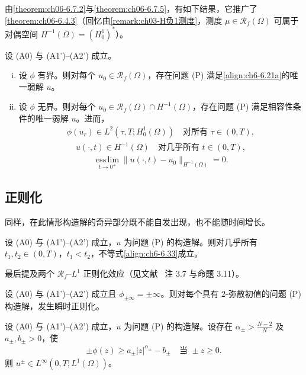 \documentclass[../../main.tex]{subfiles}%
\begin{document}
由\cref{theorem:ch06-6.7.2}与\cref{theorem:ch06-6.7.5}，有如下结果，它推广了\cref{theorem:ch06-6.4.3}（回忆由\cref{remark:ch03-H负1测度}，测度 $\mu\in\mathscr{R}_f(\Omega)$ 可属于对偶空间 $H^{-1}(\Omega)=(H^1_0)^*$）。

\begin{theorem}\label{theorem:ch06-6.7.6}
设 (A0) 与 (A1')--(A2') 成立。
\begin{enumerate}[(i)]
\item 设 $\phi$ 有界。则对每个 $u_0\in\mathscr{R}_f(\Omega)$，存在问题 (P) 满足\eqref{align:ch6-6.21a}的唯一弱解 $u$。
\item 设 $\phi$ 无界。则对每个 $u_0\in\mathscr{R}_f(\Omega)\cap H^{-1}(\Omega)$，存在问题 (P) 满足相容性条件的唯一弱解 $u$。进而，
\begin{align}
\phi(u_r)\in L^2(\tau,T;H^1_0(\Omega)) \quad\text{对所有 }\tau\in(0,T), \label{align:ch6-6.139a}
\end{align}
\begin{align}
u(\cdot,t)\in H^{-1}(\Omega) \quad\text{对几乎所有 }t\in(0,T), \label{align:ch6-6.139b}
\end{align}
\begin{align}
\operatorname*{ess\,lim}_{t\to0^+}\|u(\cdot,t)-u_0\|_{H^{-1}(\Omega)}=0. \label{align:ch6-6.139c}
\end{align}
\end{enumerate}
\end{theorem}

\subsection{正则化}\label{subsection:ch06-无界正则}

同样，在此情形构造解的奇异部分既不能自发出现，也不能随时间增长。

\begin{theorem}\label{theorem:ch06-6.7.7}
设 (A0) 与 (A1')--(A2') 成立，$u$ 为问题 (P) 的构造解。则对几乎所有 $t_1,t_2\in(0,T)$，$t_1<t_2$，不等式\eqref{align:ch6-6.33}成立。
\end{theorem}

最后提及两个 $\mathscr{R}_f$--$L^1$ 正则化效应（见文献~\cite{ref87} 注 3.7 与命题 3.11）。

\begin{proposition}\label{proposition:ch06-6.7.8}
设 (A0) 与 (A1')--(A2') 成立且 $\phi_{\pm\infty}=\pm\infty$。则对每个具有 $2$-弥散初值的问题 (P) 构造解，发生瞬时正则化。
\end{proposition}

\begin{proposition}\label{proposition:ch06-6.7.9}
设 (A0) 与 (A1')--(A2') 成立，$u$ 为问题 (P) 的构造解。设存在 $\alpha_\pm>\frac{N-2}{N}$ 及 $a_\pm,b_\pm>0$，使
\begin{align}
\pm\phi(z)\geqslant a_\pm|z|^{\alpha_\pm}-b_\pm \quad\text{当 }\pm z\geqslant0. \label{align:ch6-6.140}
\end{align}
则 $u^\pm\in L^\infty(0,T;L^1(\Omega))$。
\end{proposition}
\end{document}
